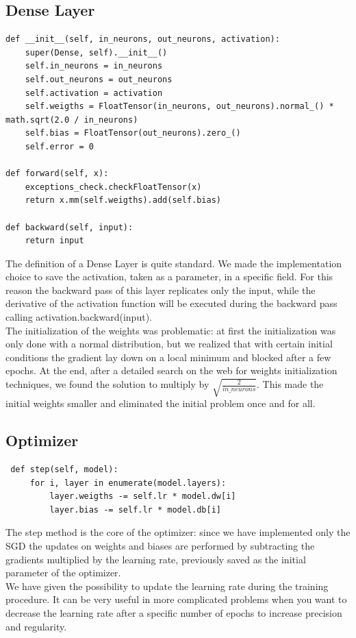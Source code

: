 \subsection{Dense Layer}
\label{sect:Dense}
\begin{verbatim}
def __init__(self, in_neurons, out_neurons, activation):
    super(Dense, self).__init__()
    self.in_neurons = in_neurons
    self.out_neurons = out_neurons
    self.activation = activation
    self.weigths = FloatTensor(in_neurons, out_neurons).normal_() * math.sqrt(2.0 / in_neurons)
    self.bias = FloatTensor(out_neurons).zero_()
    self.error = 0
    
def forward(self, x):
    exceptions_check.checkFloatTensor(x)
    return x.mm(self.weigths).add(self.bias)
    
def backward(self, input):
    return input
\end{verbatim}
The definition of a Dense Layer is quite standard. We made the implementation choice to save the activation, taken as a parameter, in a specific field. For this reason the backward pass of this layer replicates only the input, while the derivative of the activation function will be executed during the backward pass calling activation.backward(input). \\
The initialization of the weights was problematic: at first the initialization was only done with a normal distribution, but we realized that with certain initial conditions the gradient lay down on a local minimum and blocked after a few epochs. At the end, after a detailed search on the web for weights initialization techniques, we found the solution to multiply by $\sqrt{\frac{2}{in\_neurons}}$. This made the initial weights smaller and eliminated the initial problem once and for all.

\subsection{Optimizer}
\label{sect:Optimizer}

\begin{verbatim}
 def step(self, model):
	 for i, layer in enumerate(model.layers):
		 layer.weigths -= self.lr * model.dw[i] 
		 layer.bias -= self.lr * model.db[i]
\end{verbatim}
The step method is the core of the optimizer: since we have implemented only the SGD the updates on weights and biases are performed by subtracting the gradients multiplied by the learning rate, previously saved as the initial parameter of the optimizer. \\
We have given the possibility to update the learning rate during the training procedure. It can be very useful in more complicated problems when you want to decrease the learning rate after a specific number of epochs to increase precision and regularity.

